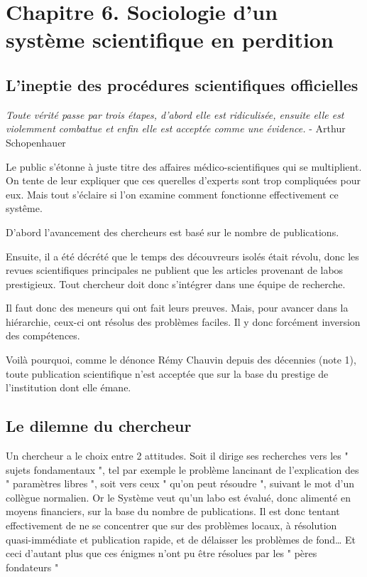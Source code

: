 \documentclass[a4paper,12pt]{article}
\begin{document}
\section{Chapitre 6. Sociologie d'un système scientifique en perdition}

\subsection {L’ineptie des procédures scientifiques officielles}

\textit{Toute vérité passe par trois étapes, d'abord elle est ridiculisée, ensuite elle est violemment combattue et enfin elle est acceptée comme une évidence.}
- Arthur Schopenhauer
      
    Le public s’étonne à juste titre des affaires médico-scientifiques qui se multiplient. On tente de leur expliquer que ces querelles d’experts sont trop compliquées pour eux. Mais tout s’éclaire si l’on examine comment fonctionne effectivement ce syst\^eme.

D’abord l’avancement des chercheurs est basé sur le nombre de publications.

Ensuite, il a été décrété que le temps des découvreurs isolés était révolu, donc les revues scientifiques principales ne publient que les articles provenant de labos prestigieux. Tout chercheur doit donc s’intégrer dans une équipe de recherche. 

Il faut donc des meneurs qui ont fait leurs preuves. Mais, pour avancer dans la hiérarchie, ceux-ci ont résolus des problèmes faciles. Il y donc forcément inversion des compétences. 

Voilà pourquoi, comme le dénonce Rémy Chauvin depuis des décennies (note 1), toute publication scientifique n’est acceptée que sur la base du prestige de l’institution dont elle émane. 


\subsection {Le dilemne du chercheur}
Un chercheur a le choix entre 2 attitudes. Soit il dirige ses recherches vers les " sujets fondamentaux ", tel par exemple le problème lancinant de l’explication des " paramètres libres ", soit vers ceux " qu’on peut résoudre ", suivant le mot d’un collègue normalien. Or le Système veut qu’un labo est évalué, donc alimenté en moyens financiers, sur la base du nombre de publications. Il est donc tentant effectivement de ne se concentrer que sur des problèmes locaux, à résolution quasi-immédiate et publication rapide, et de délaisser les problèmes de fond… Et ceci d’autant plus que ces énigmes n’ont pu être résolues par les " pères fondateurs " 
\end{document}
